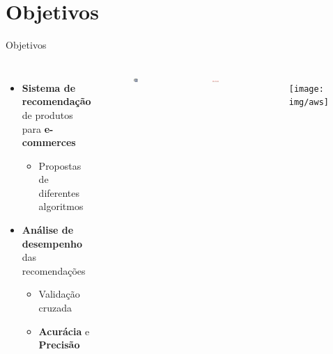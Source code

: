 \section[Objetivos]{Objetivos}
\begin{frame}{Objetivos}
\begin{columns}[c] 
\begin{itemize}
	\item \textbf{Sistema de recomendação} de produtos para \textbf{e-commerces}
	\begin{itemize}
		\item Propostas de diferentes algoritmos
	\end{itemize}
	\item \textbf{Análise de desempenho} das recomendações
	\begin{itemize}
		\item Validação cruzada
		\item \textbf{Acurácia} e \textbf{Precisão} 
	\end{itemize}
\end{itemize}

\begin{figure}[ht]
    \begin{center}
    \includegraphics[width=0.5\textwidth]{img/r}
    \end{center}
\end{figure}

\begin{figure}[ht]
    \begin{center}
    \includegraphics[width=1\textwidth]{img/movielens}
    \end{center}
\end{figure}

\begin{figure}[ht]
    \begin{center}
    \texttt{[image: img/aws]}
    \end{center}
\end{figure}

\end{columns}
\end{frame}
